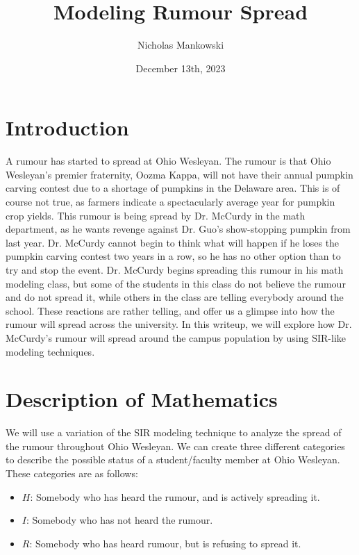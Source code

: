 \documentclass[11pt]{article}
\title{Modeling Rumour Spread}
\author{Nicholas Mankowski}
\date{December 13th, 2023}
\begin{document}
\maketitle


\large
\section{Introduction}
A rumour has started to spread at Ohio Wesleyan.  
The rumour is that Ohio Wesleyan's premier fraternity, Oozma Kappa, will not have their annual pumpkin carving contest due to a shortage of pumpkins in the Delaware area.  
This is of course not true, as farmers indicate a spectacularly average year for pumpkin crop yields.  
This rumour is being spread by Dr. McCurdy in the math department, as he wants revenge against Dr. Guo's show-stopping pumpkin from last year.  
Dr. McCurdy cannot begin to think what will happen if he loses the pumpkin carving contest two years in a row, so he has no other option than to try and stop the event.
Dr. McCurdy begins spreading this rumour in his math modeling class, but some of the students in this class do not believe the rumour and do not spread it, while others in the class are telling everybody around the school.
These reactions are rather telling, and offer us a glimpse into how the rumour will spread across the university.
In this writeup, we will explore how Dr. McCurdy's rumour will spread around the campus population by using SIR-like modeling techniques.

\section{Description of Mathematics}
We will use a variation of the SIR modeling technique to analyze the spread of the rumour throughout Ohio Wesleyan.  
We can create three different categories to describe the possible status of a student/faculty member at Ohio Wesleyan.
These categories are as follows:
\begin{itemize}
    \item $H$: Somebody who has heard the rumour, and is actively spreading it.
    \item $I$: Somebody who has not heard the rumour.
    \item $R$: Somebody who has heard rumour, but is refusing to spread it.
\end{itemize}
\end{document}
